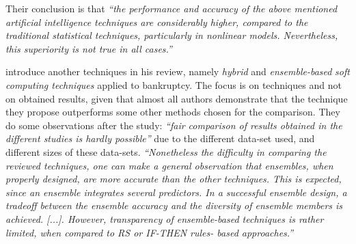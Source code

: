 Their conclusion is that \textit{``the performance and accuracy of the
above mentioned artificial intelligence techniques are considerably
higher, compared to the traditional statistical techniques,
particularly in nonlinear models. Nevertheless, this superiority is
not true in all cases.''}

\cite{verikas2010hybrid} introduce another techniques in his review,
namely \textit{hybrid} and \textit{ensemble-based} \textit{soft
computing techniques} applied to bankruptcy. The focus is on
techniques and not on obtained results, given that almost all authors
demonstrate that the technique they propose outperforms some other
methods chosen for the comparison. They do some observations after the
study: \textit{``fair comparison of results obtained in the different
studies is hardly possible''} due to the different data-set used, and
different sizes of these data-sets. \textit{``Nonetheless the
difficulty in comparing the reviewed techniques, one can make a
general observation that ensembles, when properly designed, are more
accurate than the other techniques. This is expected, since an
ensemble integrates several predictors. In a successful ensemble
design, a tradeoff between the ensemble accuracy and the diversity of
ensemble members is achieved. [...]. However, transparency of
ensemble-based techniques is rather limited, when compared to RS or
IF-THEN rules- based approaches.''}


